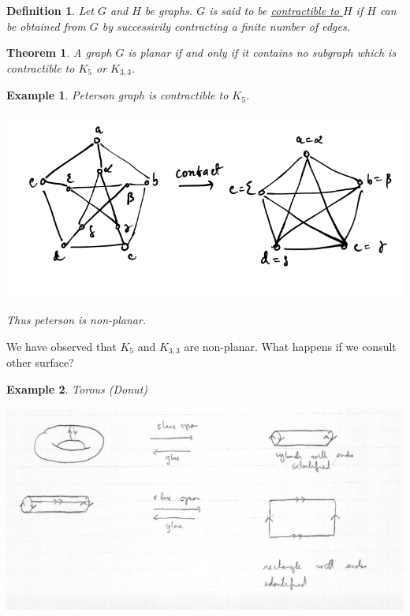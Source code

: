 \documentclass[12pt]{article}
\newtheorem{theorem}{Theorem}
\newtheorem{example}{Example}
\newtheorem{definition}{Definition}
\begin{document}
\begin{definition}
Let $G$ and $H$ be graphs. $G$ is said to be \underline{contractible to $H$} if $H$ can be obtained from $G$ by successivily contracting a finite number of edges.
\end{definition}


\begin{theorem}
A graph $G$ is planar if and only if it contains no subgraph which is contractible to $K_{5}$ or $K_{3,3}$.
\end{theorem}


\begin{example}

  Peterson graph is contractible to $K_{5}$.

  \includegraphics[scale=0.5]{petersansan}

  Thus peterson is non-planar.
\end{example}


We have observed that $K_{5}$ and $K_{3,3}$ are non-planar. What happens if we consult other surface?

\begin{example}
  Torous (Donut)
  \begin{center}

  \includegraphics[scale=0.5]{toros}
  \end{center}
\end{example}
\end{document}
